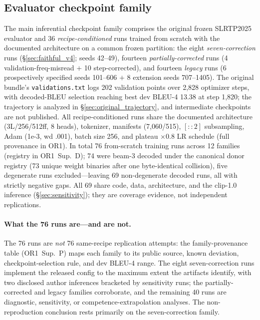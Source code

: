 \documentclass[pdflatex,sn-chicago]{sn-jnl}
\begin{document}
\subsection{Evaluator checkpoint family}
The main inferential checkpoint family comprises the original frozen SLRTP2025 evaluator and 36 \emph{recipe-conditioned} runs trained from scratch with the documented architecture on a common frozen partition: the eight \emph{seven-correction} runs (\S\ref{sec:faithful_v4}; seeds 42--49), fourteen \emph{partially-corrected} runs (4 validation-freq-misread $+$ 10 step-corrected), and fourteen \emph{legacy} runs (6 prospectively specified seeds 101--606 $+$ 8 extension seeds 707--1405). The original bundle's \texttt{validations.txt} logs 202 validation points over 2{,}828 optimizer steps, with decoded-BLEU selection reaching best dev BLEU-4 13.38 at step 1{,}820; the trajectory is analyzed in \S\ref{sec:original_trajectory}, and intermediate checkpoints are not published. All recipe-conditioned runs share the documented architecture (3L/256/512ff, 8 heads), tokenizer, manifests (7{,}060/515), $[::2]$ subsampling, Adam (1e-3, wd .001), batch size 256, and plateau $\times0.8$ LR schedule (full provenance in OR1). In total 76 from-scratch training runs across 12 families (registry in OR1~Sup.~D); 74 were beam-3 decoded under the canonical donor registry (73 unique weight binaries after one byte-identical collision), five degenerate runs excluded---leaving 69 non-degenerate decoded runs, all with strictly negative gaps. All 69 share code, data, architecture, and the clip-1.0 inference (\S\ref{sec:sensitivity}); they are coverage evidence, not independent replications.

\paragraph{What the 76 runs are---and are not.}
\label{sec:provenance_table}
The 76 runs are \emph{not} 76 same-recipe replication attempts: the family-provenance table (OR1~Sup.~P) maps each family to its public source, known deviation, checkpoint-selection rule, and dev BLEU-4 range. The eight seven-correction runs implement the released config to the maximum extent the artifacts identify, with two disclosed author inferences bracketed by sensitivity runs; the partially-corrected and legacy families corroborate, and the remaining 40 runs are diagnostic, sensitivity, or competence-extrapolation analyses. The non-reproduction conclusion rests primarily on the seven-correction family.
\end{document}
